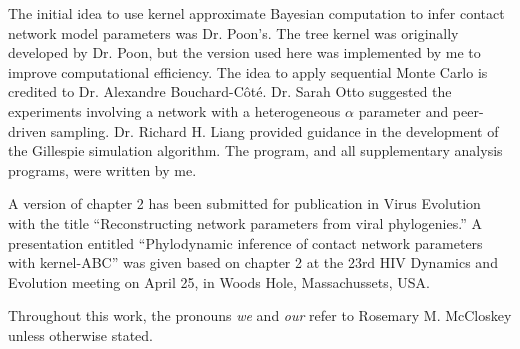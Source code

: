 The initial idea to use kernel approximate Bayesian computation to infer
contact network model parameters was Dr. Poon's. The tree kernel was originally
developed by Dr. Poon, but the version used here was implemented by me to
improve computational efficiency. The idea to apply sequential Monte Carlo is
credited to Dr. Alexandre Bouchard-C\^ot\'e. Dr. Sarah Otto suggested the
experiments involving a network with a heterogeneous $\alpha$ parameter and
peer-driven sampling. Dr. Richard H. Liang provided guidance in the development
of the Gillespie simulation algorithm. The  program, and all
supplementary analysis programs, were written by me.

A version of chapter 2 has been submitted for publication in Virus Evolution
with the title ``Reconstructing network parameters from viral phylogenies.'' A
presentation entitled ``Phylodynamic inference of contact network parameters
with kernel-ABC'' was given based on chapter 2 at the 23rd HIV Dynamics and
Evolution meeting on April 25, in Woods Hole, Massachussets, USA.

Throughout this work, the pronouns \textit{we} and \textit{our} refer to
Rosemary M. McCloskey unless otherwise stated.
